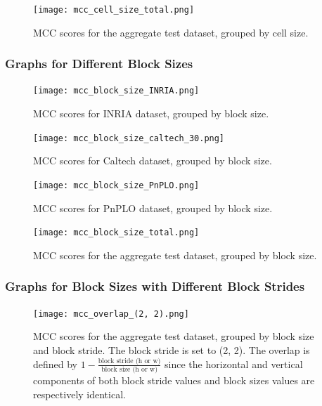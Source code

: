 \begin{figure}
    \centering
    \texttt{[image: mcc\_cell\_size\_total.png]}
    \caption{
        MCC scores for the aggregate test dataset, grouped by cell size.
    }
\end{figure}

\subsubsection{Graphs for Different Block Sizes}

\begin{figure}
    \centering
    \texttt{[image: mcc\_block\_size\_INRIA.png]}
    \caption{
        MCC scores for INRIA dataset, grouped by block size.
    }
\end{figure}

\begin{figure}
    \centering
    \texttt{[image: mcc\_block\_size\_caltech\_30.png]}
    \caption{
        MCC scores for Caltech dataset, grouped by block size.
    }
\end{figure}

\begin{figure}
    \centering
    \texttt{[image: mcc\_block\_size\_PnPLO.png]}
    \caption{
        MCC scores for PnPLO dataset, grouped by block size.
    }
\end{figure}

\begin{figure}
    \centering
    \texttt{[image: mcc\_block\_size\_total.png]}
    \caption{
        MCC scores for the aggregate test dataset, grouped by block size.
    }
\end{figure}

\subsubsection{Graphs for Block Sizes with Different Block Strides}

\begin{figure}
    \centering
    \texttt{[image: mcc\_overlap\_(2, 2).png]}
    \caption{
        MCC scores for the aggregate test dataset, grouped by block size and block stride. The block stride is set to (2, 2). The overlap is defined by $1 - \frac{\text{block stride (h or w)}}{\text{block size (h or w)}}$ since the horizontal and vertical components of both block stride values and block sizes values are respectively identical.
    }
\end{figure}

